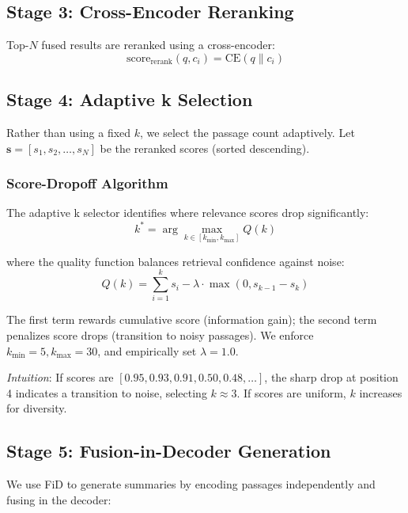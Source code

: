 \documentclass[11pt,a4paper]{article}
\begin{document}
\subsection{Stage 3: Cross-Encoder Reranking}

Top-$N$ fused results are reranked using a cross-encoder:
\begin{equation}
\text{score}_{\text{rerank}}(q, c_i) = \text{CE}(q \parallel c_i)
\end{equation}

\subsection{Stage 4: Adaptive k Selection}

Rather than using a fixed $k$, we select the passage count adaptively. Let $\mathbf{s} = [s_1, s_2, \ldots, s_N]$ be the reranked scores (sorted descending).

\subsubsection{Score-Dropoff Algorithm}

The adaptive k selector identifies where relevance scores drop significantly:
\begin{equation}
k^* = \arg\max_{k \in [k_{\min}, k_{\max}]} Q(k)
\end{equation}

where the quality function balances retrieval confidence against noise:
\begin{equation}
Q(k) = \sum_{i=1}^{k} s_i - \lambda \cdot \max(0, s_{k-1} - s_k)
\end{equation}

The first term rewards cumulative score (information gain); the second term penalizes score drops (transition to noisy passages). We enforce $k_{\min} = 5, k_{\max} = 30$, and empirically set $\lambda = 1.0$.

\emph{Intuition}: If scores are $[0.95, 0.93, 0.91, 0.50, 0.48, \ldots]$, the sharp drop at position 4 indicates a transition to noise, selecting $k \approx 3$. If scores are uniform, $k$ increases for diversity.

\subsection{Stage 5: Fusion-in-Decoder Generation}

We use FiD to generate summaries by encoding passages independently and fusing in the decoder:
\end{document}
